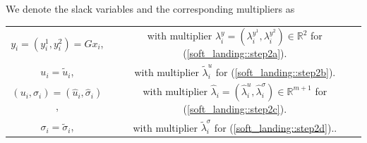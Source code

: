 \documentclass[openany]{now}
\newcommand{\reals}{{\mathbb R}}
\begin{document}
We denote the slack variables and the corresponding multipliers as \\
\begin{center}
\begin{tabular}{ c c }
  $y_i = (y_i^1,y_i^2) = Gx_i$, & with multiplier $\lambda_i^y=(\lambda_i^{y^1},\lambda_i^{y^2})\in\reals^2$ for (\ref{soft_landing::step2a}). \\
  $u_i = \tilde{u}_i$, & with multiplier $\tilde{\lambda}^{u}_i$ for (\ref{soft_landing::step2b}). \\
  $(u_i,\sigma_i) = (\hat{u}_i,\hat{\sigma}_i)$, & with multiplier $\hat{\lambda}_i=(\hat{\lambda}_i^u,\hat{\lambda}^{\sigma}_i)\in\reals^{m+1}$ for (\ref{soft_landing::step2c}). \\
  $\sigma_i = \tilde{\sigma}_i$, & with multiplier $\tilde{\lambda}^{\sigma}_i$ for (\ref{soft_landing::step2d}).\enspace.
\end{tabular}
\end{center}
\end{document}
